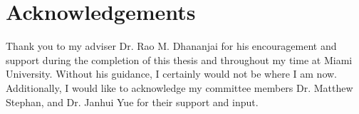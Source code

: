 \clearpage
\section*{\centering Acknowledgements}
\begin{flushleft}
Thank you to my adviser Dr. Rao M. Dhananjai for his encouragement and support during the completion of this thesis and throughout my time at Miami University.  Without his guidance, I certainly would not be where I am now.  Additionally, I would like to acknowledge my committee members Dr. Matthew Stephan, and Dr. Janhui Yue for their support and input. 

~\newline

\end{flushleft}